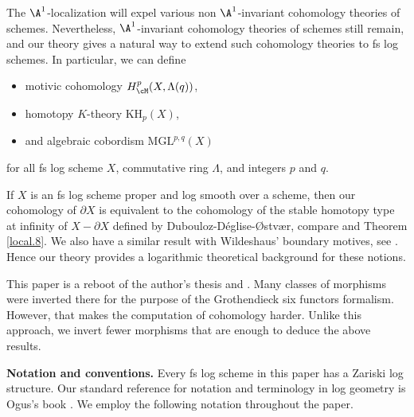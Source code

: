 \documentclass[10pt]{amsart}
\begin{document}
The $\A^1$-localization will expel various non $\A^1$-invariant cohomology theories of schemes.
Nevertheless, $\A^1$-invariant cohomology theories of schemes still remain, and our theory gives a natural way to extend such cohomology theories to fs log schemes.
In particular, we can define
\begin{itemize}
\item motivic cohomology $H_{\cM}^{p}(X,\Lambda(q))$,
\item homotopy $K$-theory $\mathrm{KH}_p(X)$,
\item and algebraic cobordism $\mathrm{MGL}^{p,q}(X)$
\end{itemize}
for all fs log scheme $X$, commutative ring $\Lambda$, and integers $p$ and $q$.

If $X$ is an fs log scheme proper and log smooth over a scheme, then our cohomology of $\partial X$ is equivalent to the cohomology of the stable homotopy type at infinity of $X-\partial X$ defined by Dubouloz-D\'eglise-{\O}stv{\ae}r, compare \cite[Remark 3.2.5]{2104.03222} and Theorem \ref{local.8}.
We also have a similar result with Wildeshaus' boundary motives, see \cite[Proposition 2.4]{zbMATH05042488}.
Hence our theory provides a logarithmic theoretical background for these notions.

This paper is a reboot of the author's thesis \cite{ParThesis} and \cite{1707.09435}.
Many classes of morphisms were inverted there for the purpose of the Grothendieck six functors formalism.
However, that makes the computation of cohomology harder.
Unlike this approach, we invert fewer morphisms that are enough to deduce the above results.



\vspace{0.1in}
\noindent \textbf{Notation and conventions.}
Every fs log scheme in this paper has a Zariski log structure.
Our standard reference for notation and terminology in log geometry is Ogus's book \cite{Ogu}.
We employ the following notation throughout the paper.
\end{document}
